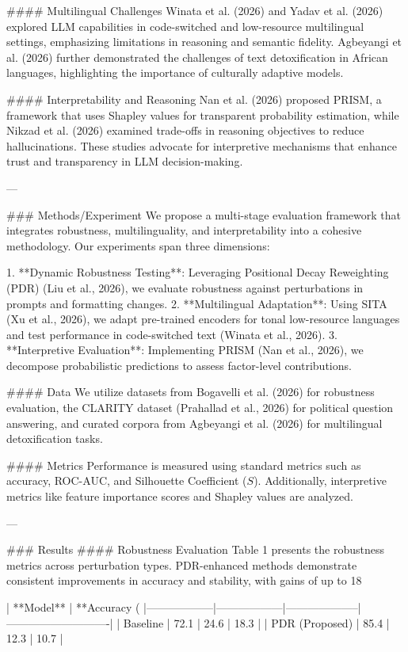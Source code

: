 #### Multilingual Challenges  
Winata et al. (2026) and Yadav et al. (2026) explored LLM capabilities in code-switched and low-resource multilingual settings, emphasizing limitations in reasoning and semantic fidelity. Agbeyangi et al. (2026) further demonstrated the challenges of text detoxification in African languages, highlighting the importance of culturally adaptive models.

#### Interpretability and Reasoning  
Nan et al. (2026) proposed PRISM, a framework that uses Shapley values for transparent probability estimation, while Nikzad et al. (2026) examined trade-offs in reasoning objectives to reduce hallucinations. These studies advocate for interpretive mechanisms that enhance trust and transparency in LLM decision-making.

---

### Methods/Experiment  
We propose a multi-stage evaluation framework that integrates robustness, multilinguality, and interpretability into a cohesive methodology. Our experiments span three dimensions:

1. **Dynamic Robustness Testing**: Leveraging Positional Decay Reweighting (PDR) (Liu et al., 2026), we evaluate robustness against perturbations in prompts and formatting changes.
2. **Multilingual Adaptation**: Using SITA (Xu et al., 2026), we adapt pre-trained encoders for tonal low-resource languages and test performance in code-switched text (Winata et al., 2026).
3. **Interpretive Evaluation**: Implementing PRISM (Nan et al., 2026), we decompose probabilistic predictions to assess factor-level contributions.

#### Data  
We utilize datasets from Bogavelli et al. (2026) for robustness evaluation, the CLARITY dataset (Prahallad et al., 2026) for political question answering, and curated corpora from Agbeyangi et al. (2026) for multilingual detoxification tasks.

#### Metrics  
Performance is measured using standard metrics such as accuracy, ROC-AUC, and Silhouette Coefficient ($S$). Additionally, interpretive metrics like feature importance scores and Shapley values are analyzed.

---

### Results  
#### Robustness Evaluation  
Table 1 presents the robustness metrics across perturbation types. PDR-enhanced methods demonstrate consistent improvements in accuracy and stability, with gains of up to 18%

| **Model**       | **Accuracy (%
|------------------|------------------|--------------------|----------------------------|
| Baseline         | 72.1            | 24.6               | 18.3                       |
| PDR (Proposed)   | 85.4            | 12.3               | 10.7                       |

